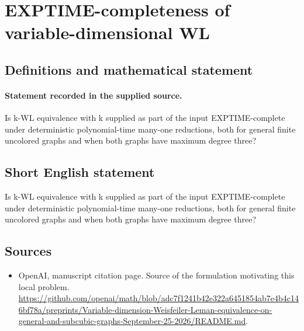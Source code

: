 \documentclass[11pt]{article}
\begin{document}
\section*{EXPTIME-completeness of variable-dimensional WL}\label{30007494}
\subsection{Definitions and mathematical statement}
\paragraph{Statement recorded in the supplied source.}
Is k-WL equivalence with k supplied as part of the input EXPTIME-complete under deterministic polynomial-time many-one reductions, both for general finite uncolored graphs and when both graphs have maximum degree three?
\subsection{Short English statement}
Is k-WL equivalence with k supplied as part of the input EXPTIME-complete under deterministic polynomial-time many-one reductions, both for general finite uncolored graphs and when both graphs have maximum degree three?
\subsection{Sources}
\begin{itemize}
\item[S1] OpenAI, manuscript citation page. Source of the formulation motivating this local problem.
\url{https://github.com/openai/math/blob/adc7f1241b42e322a6451854ab7e4b4c146bf78a/preprints/Variable-dimension-Weisfeiler-Leman-equivalence-on-general-and-subcubic-graphs-September-25-2026/README.md}.
\end{itemize}
\end{document}
